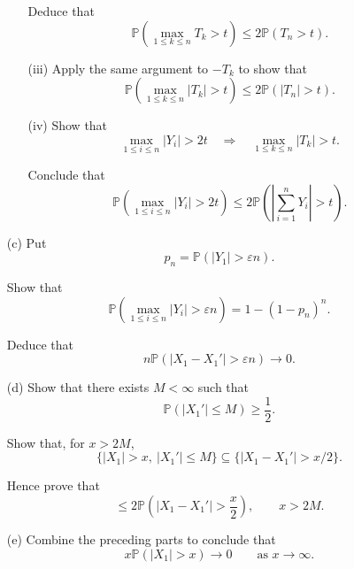 \begin{quiz}
\begin{enumerate}
\begin{enumerate}
        Deduce that
        \[
        \mathbb{P}
        \left(
        \max_{1\leq k\leq n}T_k>t
        \right)
        \leq
        2\mathbb{P}(T_n>t).
        \]

        \item[(iii)]
        Apply the same argument to $-T_k$ to show that
        \[
        \mathbb{P}
        \left(
        \max_{1\leq k\leq n}|T_k|>t
        \right)
        \leq
        2\mathbb{P}(|T_n|>t).
        \]

        \item[(iv)]
        Show that
        \[
        \max_{1\leq i\leq n}|Y_i|>2t
        \quad\Longrightarrow\quad
        \max_{1\leq k\leq n}|T_k|>t.
        \]

        Conclude that
        \[
        \mathbb{P}
        \left(
        \max_{1\leq i\leq n}|Y_i|>2t
        \right)
        \leq
        2\mathbb{P}
        \left(
        \left|
        \sum_{i=1}^nY_i
        \right|
        >t
        \right).
        \]

    \end{enumerate}


    \item[(c)]
    Put
    \[
    p_n
    =
    \mathbb{P}(|Y_1|>\varepsilon n).
    \]

    Show that
    \[
    \mathbb{P}
    \left(
    \max_{1\leq i\leq n}|Y_i|>\varepsilon n
    \right)
    =
    1-(1-p_n)^n.
    \]

    Deduce that
    \[
    n\mathbb{P}
    \left(
    |X_1-X_1'|>\varepsilon n
    \right)
    \longrightarrow0.
    \]


    \item[(d)]
    Show that there exists $M<\infty$ such that
    \[
    \mathbb{P}(|X_1'|\leq M)\geq\frac12.
    \]

    Show that, for $x>2M$,
    \[
    \{
    |X_1|>x,\ |X_1'|\leq M
    \}
    \subseteq
    \{
    |X_1-X_1'|>x/2
    \}.
    \]

    Hence prove that
    \[
    \leq
    2\mathbb{P}
    \left(
    |X_1-X_1'|>\frac{x}{2}
    \right),
    \qquad x>2M.
    \]


    \item[(e)]
    Combine the preceding parts to conclude that
    \[
    x\mathbb{P}(|X_1|>x)
    \longrightarrow0
    \qquad\text{as }x\to\infty.
    \]

\end{enumerate}

\end{quiz}





